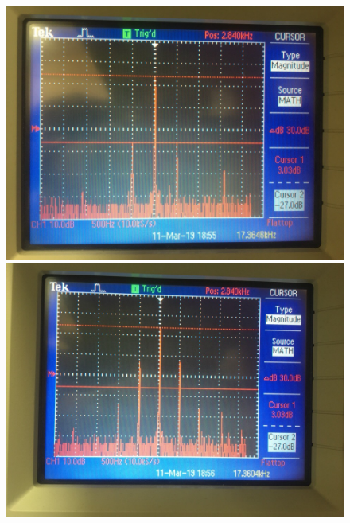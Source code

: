 \begin{figure}[H]
	\centering
\begin{minipage}{0.45\linewidth}
	\centering
	\includegraphics[width=\linewidth]{photo/task32(1).jpg}
\end{minipage}
\begin{minipage}{0.45\linewidth}
	\centering
	\includegraphics[width=\linewidth]{photo/task32(2).jpg}
\end{minipage}
\begin{minipage}{0.45\linewidth}
	\centering

\end{minipage}
\end{figure}
